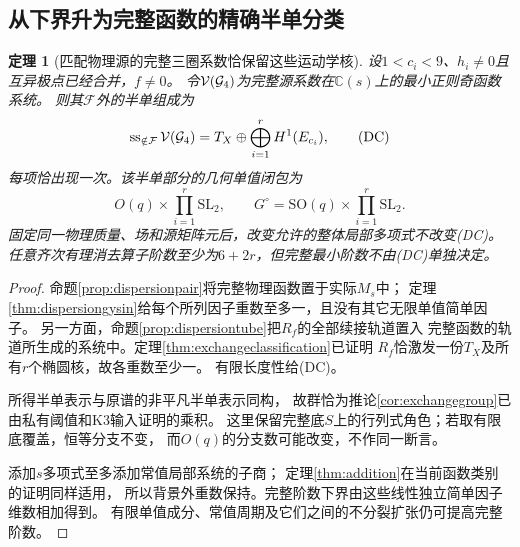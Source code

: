 \documentclass[11pt,a4paper]{ctexart}
\theoremstyle{cnplain}\newtheorem{theorem}{定理}[section]
\theoremstyle{definition}\newtheorem{definition}[theorem]{定义}
\theoremstyle{remark}\newtheorem{remark}[theorem]{注}
\begin{document}
\subsection{从下界升为完整函数的精确半单分类}
\begin{theorem}[匹配物理源的完整三圈系数恰保留这些运动学核]\label{thm:dispersionexact}
设$1<c_i<9$、$h_i\ne0$且互异极点已经合并，$f\ne0$。
令$\mathcal V({\cal G}_4)$为完整源系数在$\mathbb C(s)$上的最小正则奇函数系统。
则其$\mathcal F$外的半单组成为
\[
 \operatorname{ss}_{\notin\mathcal F}\mathcal V({\cal G}_4)
       = T_X\oplus\bigoplus_{i=1}^rH^1(E_{c_i}) ,
 \tag{DC}\label{eq:dispersionexact}
\]
每项恰出现一次。该半单部分的几何单值闭包为
\[
 O(q)\times\prod_{i=1}^r\mathrm{SL}_2,\qquad
 G^\circ=\mathrm{SO}(q)\times\prod_{i=1}^r\mathrm{SL}_2 .
\]
固定同一物理质量、场和源矩阵元后，改变允许的整体局部多项式不改变(DC)。
任意齐次有理消去算子阶数至少为$6+2r$，但完整最小阶数不由(DC)单独决定。
\end{theorem}
\begin{proof}
命题\ref{prop:dispersionpair}将完整物理函数置于实际$M_s$中；
定理\ref{thm:dispersiongysin}给每个所列因子重数至多一，且没有其它无限单值简单因子。
另一方面，命题\ref{prop:dispersiontube}把$R_f$的全部续接轨道置入
完整函数的轨道所生成的系统中。定理\ref{thm:exchangeclassification}已证明
$R_f$恰激发一份$T_X$及所有$r$个椭圆核，故各重数至少一。
有限长度性给(DC)。

所得半单表示与原谱的非平凡半单表示同构，
故群恰为推论\ref{cor:exchangegroup}已由私有阈值和K3输入证明的乘积。
这里保留完整底$S$上的行列式角色；若取有限底覆盖，恒等分支不变，
而$O(q)$的分支数可能改变，不作同一断言。

添加$s$多项式至多添加常值局部系统的子商；
定理\ref{thm:addition}在当前函数类别的证明同样适用，
所以背景外重数保持。完整阶数下界由这些线性独立简单因子维数相加得到。
有限单值成分、常值周期及它们之间的不分裂扩张仍可提高完整阶数。
\end{proof}
\end{document}
